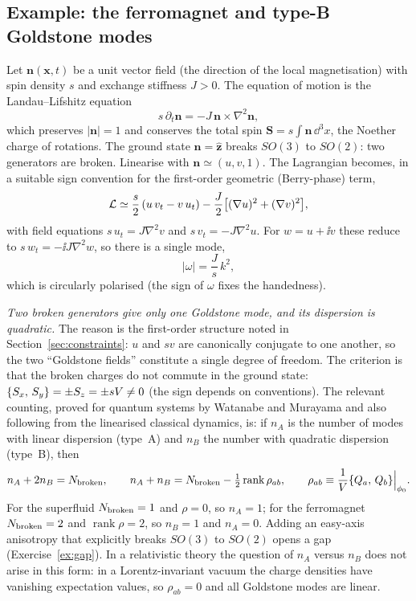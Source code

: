 \subsection{Example: the ferromagnet and type-B Goldstone modes}

Let $\mathbf{n}(\mathbf{x},t)$ be a unit vector field (the direction of the local magnetisation) with
spin density $s$ and exchange stiffness $J>0$. The equation of motion is the Landau--Lifshitz equation
\begin{equation}
  s\,\partial_t\mathbf{n}=-J\,\mathbf{n}\times\nabla^2\mathbf{n},
\end{equation}
which preserves $|\mathbf{n}|=1$ and conserves the total spin $\mathbf{S}=s\!\int\!\mathbf{n}\,\dd^3x$, the Noether charge of
rotations. The ground state $\mathbf{n}=\hat{\mathbf{z}}$ breaks $SO(3)$ to $SO(2)$: two generators are broken.
Linearise with $\mathbf{n}\simeq(u,v,1)$. The Lagrangian becomes, in a suitable sign convention for
the first-order geometric (Berry-phase) term,
\begin{equation}
  \mathcal{L}\simeq\frac s2\,(u\,v_t-v\,u_t)-\frac J2\big[(\nabla u)^2+(\nabla v)^2\big],
\end{equation}
with field equations $s\,u_t=J\nabla^2v$ and $s\,v_t=-J\nabla^2u$. For $w=u+\ii v$ these reduce to
$s\,w_t=-\ii J\nabla^2w$, so there is a single mode,
\begin{equation}
  |\omega|=\frac{J}{s}\,k^2 ,
\end{equation}
which is circularly polarised (the sign of $\omega$ fixes the handedness).

\emph{Two broken generators give only one Goldstone mode, and its dispersion is
quadratic.} The reason is the first-order structure noted in Section~\ref{sec:constraints}: $u$ and $sv$ are
canonically conjugate to one another, so the two ``Goldstone fields'' constitute a
single degree of freedom. The criterion is that the broken charges do not
commute in the ground state: $\{S_x,\,S_y\}=\pm S_z=\pm sV\neq0$ (the sign depends on conventions). The relevant counting,
proved for quantum systems by Watanabe and Murayama and also following from
the linearised classical dynamics, is: if $n_A$ is the number of modes with linear
dispersion (type~A) and $n_B$ the number with quadratic dispersion (type~B), then
\begin{equation}
  n_A+2n_B=N_{\rm broken},\qquad n_A+n_B=N_{\rm broken}-\tfrac12\operatorname{rank}\rho_{ab},
  \qquad \rho_{ab}\equiv\frac1V\{Q_a,\,Q_b\}\Big|_{\phi_0} .
\end{equation}
For the superfluid $N_{\rm broken}=1$ and $\rho=0$, so $n_A=1$; for the ferromagnet
$N_{\rm broken}=2$ and $\operatorname{rank}\rho=2$, so $n_B=1$ and $n_A=0$. Adding an
easy-axis anisotropy that explicitly breaks $SO(3)$ to $SO(2)$ opens a gap
(Exercise~\ref{ex:gap}). In a relativistic theory the question of $n_A$ versus $n_B$ does not arise in this form: in a
Lorentz-invariant vacuum the charge densities have vanishing expectation values, so $\rho_{ab}=0$
and all Goldstone modes are linear.

